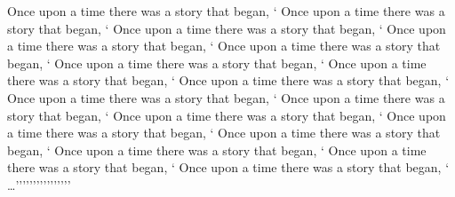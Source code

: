 \documentclass[a4paper]{article}
\begin{document}
Once upon a time there was a story that began, `%
Once upon a time there was a story that began, `%
Once upon a time there was a story that began, `%
Once upon a time there was a story that began, `%
Once upon a time there was a story that began, `%
Once upon a time there was a story that began, `%
Once upon a time there was a story that began, `%
Once upon a time there was a story that began, `%
Once upon a time there was a story that began, `%
Once upon a time there was a story that began, `%
Once upon a time there was a story that began, `%
Once upon a time there was a story that began, `%
Once upon a time there was a story that began, `%
Once upon a time there was a story that began, `%
Once upon a time there was a story that began, `%
Once upon a time there was a story that began, `%
\ldots''''''''''''''''
\end{document}
